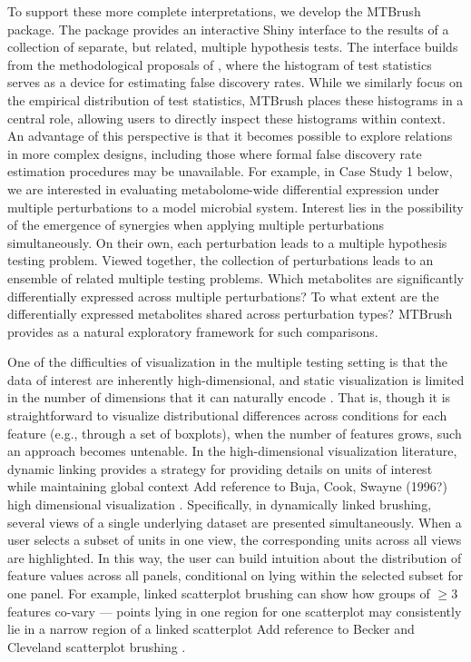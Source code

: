 To support these more complete interpretations, we develop the MTBrush
package. The package provides an interactive Shiny interface to the
results of a collection of separate, but related, multiple hypothesis
tests. The interface builds from the methodological proposals of
\citep[\citet{stephens}]{efron2021computer}, where the histogram of test
statistics serves as a device for estimating false discovery rates.
While we similarly focus on the empirical distribution of test
statistics, MTBrush places these histograms in a central role, allowing
users to directly inspect these histograms within context. An advantage
of this perspective is that it becomes possible to explore relations in
more complex designs, including those where formal false discovery rate
estimation procedures may be unavailable. For example, in Case Study 1
below, we are interested in evaluating metabolome-wide differential
expression under multiple perturbations to a model microbial system.
Interest lies in the possibility of the emergence of synergies when
applying multiple perturbations simultaneously. On their own, each
perturbation leads to a multiple hypothesis testing problem. Viewed
together, the collection of perturbations leads to an ensemble of
related multiple testing problems. Which metabolites are significantly
differentially expressed across multiple perturbations? To what extent
are the differentially expressed metabolites shared across perturbation
types? MTBrush provides as a natural exploratory framework for such
comparisons.

One of the difficulties of visualization in the multiple testing setting
is that the data of interest are inherently high-dimensional, and static
visualization is limited in the number of dimensions that it can
naturally encode \citep{Wills}. That is, though it is straightforward to
visualize distributional differences across conditions for each feature
(e.g., through a set of boxplots), when the number of features grows,
such an approach becomes untenable. In the high-dimensional
visualization literature, dynamic linking provides a strategy for
providing details on units of interest while maintaining global context
\color{violet} Add reference to Buja, Cook, Swayne (1996?) high
dimensional visualization \color{black}. Specifically, in dynamically
linked brushing, several views of a single underlying dataset are
presented simultaneously. When a user selects a subset of units in one
view, the corresponding units across all views are highlighted. In this
way, the user can build intuition about the distribution of feature
values across all panels, conditional on lying within the selected
subset for one panel. For example, linked scatterplot brushing can show
how groups of \(\geq 3\) features co-vary --- points lying in one region
for one scatterplot may consistently lie in a narrow region of a linked
scatterplot \color{violet} Add reference to Becker and Cleveland
scatterplot brushing \color{black}.

